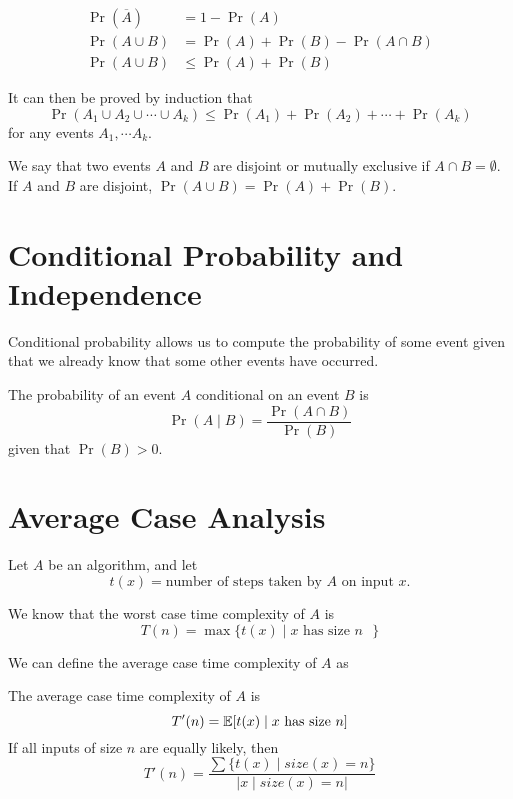 \begin{theorem}
    $$
    \begin{aligned}
        \Pr(\overline{A}) &= 1 - \Pr(A) \\
        \Pr(A \cup B) &= \Pr(A) + \Pr(B) - \Pr(A \cap B) \\
        \Pr(A \cup B) &\leq \Pr(A) + \Pr(B)
    \end{aligned}
    $$
\end{theorem}

It can then be proved by induction that
$$
\Pr(A_1 \cup A_2 \cup \cdots \cup A_k) \leq \Pr(A_1) + \Pr(A_2) + \cdots + \Pr(A_k)
$$
for any events $A_1, \cdots A_k$.

We say that two events $A$ and $B$ are disjoint or mutually exclusive if $A \cap B = \emptyset$. If $A$ and $B$ are disjoint, $\Pr(A \cup B) = \Pr(A) + \Pr(B)$.

\section{Conditional Probability and Independence}

Conditional probability allows us to compute the probability of some event given that we already know that some other events have occurred.

\begin{definition} 
    The probability of an event $A$ conditional on an event $B$ is
    $$
    \Pr(A \mid B) = \frac{\Pr(A \cap B)}{\Pr(B)}
    $$
    given that $\Pr(B) > 0$. 
\end{definition}

\section{Average Case Analysis}

Let $A$ be an algorithm, and let
\[
t(x) = \text{number of steps taken by $A$ on input $x$}
.\] 

We know that the worst case time complexity of $A$ is
$$
T(n) = \max \{ t(x) \mid \text{$x$ has size $n$ } \}
$$

We can define the average case time complexity of $A$ as

\begin{definition} 
    The average case time complexity of $A$ is
    $$
    T'(n) = \operatorname*{\mathbb{E}} [ t(x) \mid \text{$x$ has size $n$} ]
    $$
    If all inputs of size $n$ are equally likely, then
    $$
    T'(n) = \frac{\sum \{ t(x) \mid size(x) = n \}}{| x \mid size(x) = n |}
    $$
\end{definition}

